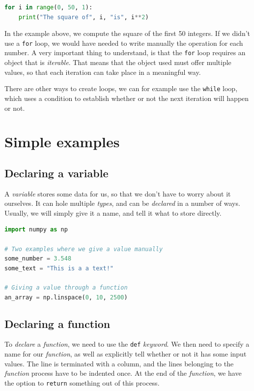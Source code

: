 \documentclass[twocolumn]{article}
\begin{document}
\begin{lstlisting}[language=Python]
for i in range(0, 50, 1):
    print("The square of", i, "is", i**2)
\end{lstlisting}

In the example above, we compute the square of the first 50 integers. If we didn't use a \verb|for| loop, we would have needed to write manually the operation for each number. A very important thing to understand, is that the \verb|for| loop requires an object that is \emph{iterable}. That means that the object used must offer multiple values, so that each iteration can take place in a meaningful way.

There are other ways to create loops, we can for example use the \verb|while| loop, which uses a condition to establish whether or not the next iteration will happen or not.


\section{Simple examples}

\subsection{Declaring a variable}

A \emph{variable} stores some data for us, so that we don't have to worry about it ourselves. It can hole multiple \emph{types}, and can be \emph{declared} in a number of ways. Usually, we will simply give it a name, and tell it what to store directly.

\begin{lstlisting}[language=Python]
import numpy as np

# Two examples where we give a value manually
some_number = 3.548
some_text = "This is a a text!"

# Giving a value through a function
an_array = np.linspace(0, 10, 2500)
\end{lstlisting}

\subsection{Declaring a function}

To \emph{declare} a \emph{function}, we need to use the \verb|def| \emph{keyword}. We then need to specify a name for our \emph{function}, as well as explicitly tell whether or not it has some input values. The line is terminated with a column, and the lines belonging to the \emph{function} process have to be indented once. At the end of the \emph{function}, we have the option to \verb|return| something out of this process.
\end{document}
